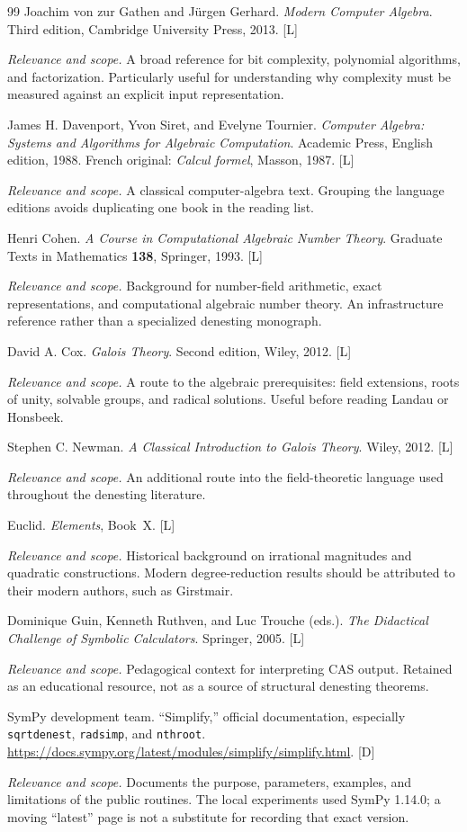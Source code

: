 \documentclass[11pt,oneside]{article}
\numberwithin{equation}{section}
\theoremstyle{definition}
\theoremstyle{remark}
\newcommand{\status}[1]{\textsf{\small[#1]}}
\newcommand{\entrynote}[1]{\par\smallskip\noindent\emph{Relevance and scope.} #1}
\begin{document}
\begin{thebibliography}{99}
Joachim von zur Gathen and J\"urgen Gerhard. \emph{Modern Computer Algebra}. Third edition, Cambridge University Press, 2013. \status{L}
\entrynote{A broad reference for bit complexity, polynomial algorithms, and factorization. Particularly useful for understanding why complexity must be measured against an explicit input representation.}

James H. Davenport, Yvon Siret, and Evelyne Tournier. \emph{Computer Algebra: Systems and Algorithms for Algebraic Computation}. Academic Press, English edition, 1988. French original: \emph{Calcul formel}, Masson, 1987. \status{L}
\entrynote{A classical computer-algebra text. Grouping the language editions avoids duplicating one book in the reading list.}

Henri Cohen. \emph{A Course in Computational Algebraic Number Theory}. Graduate Texts in Mathematics \textbf{138}, Springer, 1993. \status{L}
\entrynote{Background for number-field arithmetic, exact representations, and computational algebraic number theory. An infrastructure reference rather than a specialized denesting monograph.}

David A. Cox. \emph{Galois Theory}. Second edition, Wiley, 2012. \status{L}
\entrynote{A route to the algebraic prerequisites: field extensions, roots of unity, solvable groups, and radical solutions. Useful before reading Landau or Honsbeek.}

Stephen C. Newman. \emph{A Classical Introduction to Galois Theory}. Wiley, 2012. \status{L}
\entrynote{An additional route into the field-theoretic language used throughout the denesting literature.}

Euclid. \emph{Elements}, Book~X. \status{L}
\entrynote{Historical background on irrational magnitudes and quadratic constructions. Modern degree-reduction results should be attributed to their modern authors, such as Girstmair.}

Dominique Guin, Kenneth Ruthven, and Luc Trouche (eds.). \emph{The Didactical Challenge of Symbolic Calculators}. Springer, 2005. \status{L}
\entrynote{Pedagogical context for interpreting CAS output. Retained as an educational resource, not as a source of structural denesting theorems.}

SymPy development team. ``Simplify,'' official documentation, especially \texttt{sqrtdenest}, \texttt{radsimp}, and \texttt{nthroot}. \url{https://docs.sympy.org/latest/modules/simplify/simplify.html}. \status{D}
\entrynote{Documents the purpose, parameters, examples, and limitations of the public routines. The local experiments used SymPy 1.14.0; a moving ``latest'' page is not a substitute for recording that exact version.}


\end{thebibliography}
\end{document}
